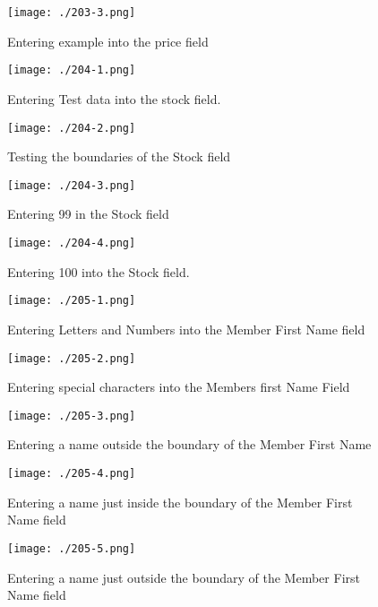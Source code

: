 \begin{figure}[H]
    \texttt{[image: ./203-3.png]}
    \caption{Entering example into the price field} \label{fig:203-3}
\end{figure}

\begin{figure}[H]
    \texttt{[image: ./204-1.png]}
    \caption{Entering Test data into the stock field.} \label{fig:204-1}
\end{figure}

\begin{figure}[H]
    \texttt{[image: ./204-2.png]}
    \caption{Testing the boundaries of the Stock field} \label{fig:204-2}
\end{figure}

\begin{figure}[H]
    \texttt{[image: ./204-3.png]}
    \caption{Entering 99 in the Stock field} \label{fig:204-3}
\end{figure}

\begin{figure}[H]
    \texttt{[image: ./204-4.png]}
    \caption{Entering 100 into the Stock field.} \label{fig:204-4}
\end{figure}

\begin{figure}[H]
    \texttt{[image: ./205-1.png]}
    \caption{Entering Letters and Numbers into the Member First Name field} \label{fig:205-1}
\end{figure}

\begin{figure}[H]
    \texttt{[image: ./205-2.png]}
    \caption{Entering special characters into the Members first Name Field} \label{fig:205-2}
\end{figure}

\begin{figure}[H]
    \texttt{[image: ./205-3.png]}
    \caption{Entering a name outside the boundary of the Member First Name} \label{fig:205-3}
\end{figure}

\begin{figure}[H]
    \texttt{[image: ./205-4.png]}
    \caption{Entering a name just inside the boundary of the Member First Name field} \label{fig:205-4}
\end{figure}

\begin{figure}[H]
    \texttt{[image: ./205-5.png]}
    \caption{Entering a name just outside the boundary of the Member First Name field} \label{fig:205-5}
\end{figure}

